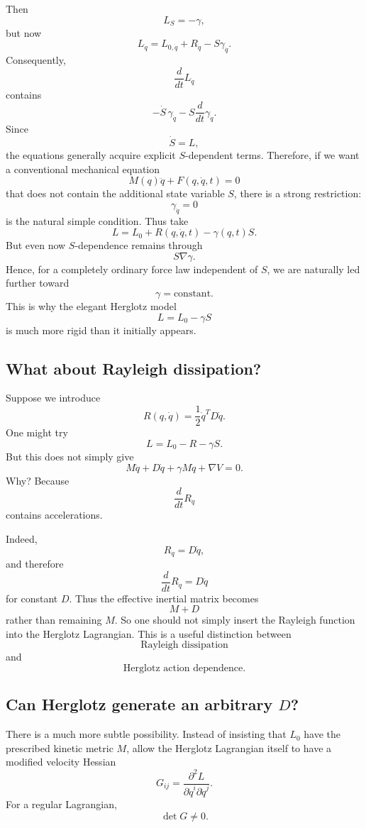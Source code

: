 Then $$ L_S=-\gamma, $$ but now
$$ L_{\dot q} = L_{0,\dot q}+R_{\dot q} -S\gamma_{\dot q}. $$
Consequently,
$$ \frac{d}{dt}L_{\dot q} $$ contains
$$ -\dot S\,\gamma_{\dot q} -S\frac{d}{dt}\gamma_{\dot q}. $$
Since $$ \dot S=L, $$
the equations generally acquire explicit \(S\)-dependent terms.
Therefore, if we want a conventional mechanical equation
$$ M(q)\ddot q+F(q,\dot q,t)=0 $$
that does not contain the additional state variable \(S\), there is a strong restriction:
$$ \boxed{ \gamma_{\dot q}=0 } $$
is the natural simple condition.
Thus take
\begin{equation}
 \boxed{ L=L_0+R(q,\dot q,t)-\gamma(q,t)S. } \tag{11} 
\end{equation}
But even now \(S\)-dependence remains through
$$ S\nabla\gamma. $$
Hence, for a completely ordinary force law independent of \(S\), we are naturally led further toward
\begin{equation}
 \boxed{ \gamma=\text{constant}. } \tag{12} 
\end{equation}
This is why the elegant Herglotz model
$$ L=L_0-\gamma S $$
is much more rigid than it initially appears.

\subsection{What about Rayleigh dissipation?}

Suppose we introduce
$$ R(q,\dot q) = \frac12\dot q^TD\dot q. $$
One might try $$ L=L_0-R-\gamma S. $$
But this does not simply give
$$ M\ddot q+D\dot q+\gamma M\dot q+\nabla V=0. $$
Why? Because $$ \frac{d}{dt}R_{\dot q} $$
contains accelerations.

Indeed,$$ R_{\dot q}=D\dot q, $$ and therefore
$$ \frac{d}{dt}R_{\dot q} = D\ddot q $$
for constant \(D\).
Thus the effective inertial matrix becomes $$ M+D $$
rather than remaining \(M\).
So one should not simply insert the Rayleigh function into the Herglotz Lagrangian.
This is a useful distinction between
$$ \text{Rayleigh dissipation} $$ and $$ \text{Herglotz action dependence}. $$

\subsection{Can Herglotz generate an arbitrary \(D\)?}

There is a much more subtle possibility.
Instead of insisting that \(L_0\) have the prescribed kinetic metric \(M\), allow the Herglotz Lagrangian itself to have a modified velocity Hessian
$$ \boxed{ G_{ij} = \frac{\partial^2L} {\partial\dot q^i\partial\dot q^j}. } $$
For a regular Lagrangian, $$ \det G\neq0. $$

